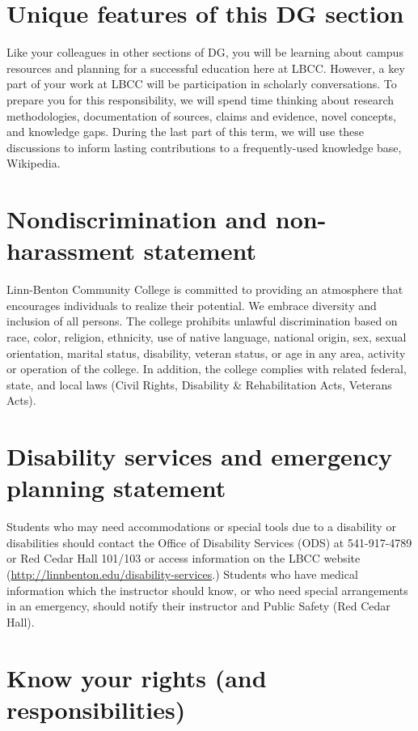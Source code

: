 \documentclass[12pt,article,oneside]{memoir}
\begin{document}
\section{Unique features of this DG section}
Like your colleagues in other sections of DG, you will be learning about campus resources and planning for a successful education here at LBCC.  However, a key part of your work at LBCC will be participation in scholarly conversations.  To prepare you for this responsibility, we will spend time thinking about research methodologies, documentation of sources, claims and evidence, novel concepts, and knowledge gaps.  During the last part of this term, we will use these discussions to inform lasting contributions to a frequently-used knowledge base, Wikipedia.



\section{Nondiscrimination and non-harassment statement}

Linn-Benton Community College is committed to providing an atmosphere that  encourages individuals to realize their potential. We embrace diversity and inclusion of all persons. The college prohibits unlawful discrimination based on race, color, religion, ethnicity, use of native language, national origin, sex, sexual orientation, marital status, disability, veteran status, or age in any area, activity or operation of the college. In addition, the college complies with related federal, state, and local laws (Civil Rights, Disability \& Rehabilitation Acts, Veterans Acts).

\section{Disability services and emergency planning statement}

Students who may need accommodations or special tools due to a disability or disabilities should contact the Office of Disability Services (ODS) at 541-917-4789 or Red Cedar Hall 101/103 or access information on the LBCC website (\url{http://linnbenton.edu/disability-services}.) Students who have medical information which the instructor should know, or who need special arrangements in an emergency, should notify their instructor and Public Safety (Red Cedar Hall).

\section{Know your rights (and responsibilities)}
\end{document}
